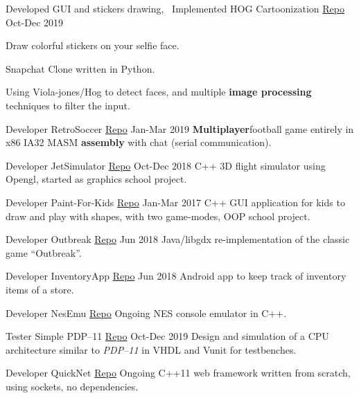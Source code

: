 \begin{cventries}
  \cventry
    {Developed GUI and stickers drawing, ~Implemented HOG} %
    {Cartoonization \tiny{\href{http://github.com/Abdulrahman-Khalid/Cartoonization/}{Repo}}} %
    {} %
    {Oct-Dec 2019} %
    {
      \begin{cvitems} %
        \item {Draw colorful stickers on your selfie face.}
        \item {Snapchat Clone written in Python.}
        \item {Using ​Viola-jones/Hog ​to detect faces, and multiple \textbf{image processing} techniques to filter the input.}
      \end{cvitems}
    }

  \cventry
    {Developer} %
    {RetroSoccer \tiny{\href{https://github.com/mido3ds/retrosoccer}{Repo}}} %
    {} %
    {Jan-Mar 2019} %
    {
      {\textbf{Multiplayer​} football ​game​ entirely in x86 IA32 MASM \textbf{​assembly​} with chat (serial communication).}
    }

  \cventry
    {Developer} %
    {JetSimulator \tiny{\href{https://github.com/mido3ds/JetSimulator}{Repo}}} %
    {} %
    {Oct-Dec 2018} %
    {
      {C++ 3D​ ​flight simulator​ using Opengl, started as graphics school project.}
    }

  \cventry
    {Developer} %
    {Paint-For-Kids \tiny{\href{https://github.com/mido3ds/paint-for-kids}{Repo}}} %
    {} %
    {Jan-Mar 2017} %
    {
      {C++ ​GUI​ application for kids to ​ draw​ and play with shapes, with ​two game-modes​, OOP school project.}
    }

  \cventry
    {Developer} %
    {Outbreak \tiny{\href{https://github.com/mido3ds/Outbreak}{Repo}}} %
    {} %
    {Jun 2018} %
    {
      {Java​/libgdx re-implementation of the classic ​game​ ``Outbreak”.}
    }

  \cventry
    {Developer} %
    {InventoryApp \tiny{\href{https://github.com/mido3ds/InventoryApp}{Repo}}} %
    {} %
    {Jun 2018} %
    {
      Android​ app to keep track of inventory ​items of a store​.
    }

  \cventry
    {Developer} %
    {NesEmu \tiny{\href{https://github.com/mido3ds/nesemu}{Repo}}} %
    {} %
    {Ongoing} %
    {
      NES console ​emulator​ in C++.
    }

  \cventry
    {Tester} %
    {Simple PDP--11 \tiny{\href{https://github.com/mido3ds/simple-pdp11}{Repo}}} %
    {} %
    {Oct-Dec 2019} %
    {
      Design and simulation of a CPU architecture similar to \emph{PDP--11} in VHDL and Vunit for testbenches.
    }

  \cventry
    {Developer} %
    {QuickNet \tiny{\href{https://github.com/mido3ds/QuickNet}{Repo}}} %
    {} %
    {Ongoing} %
    {
      C++11 web framework​ written from scratch, using sockets, no dependencies.
    }

\end{cventries}


